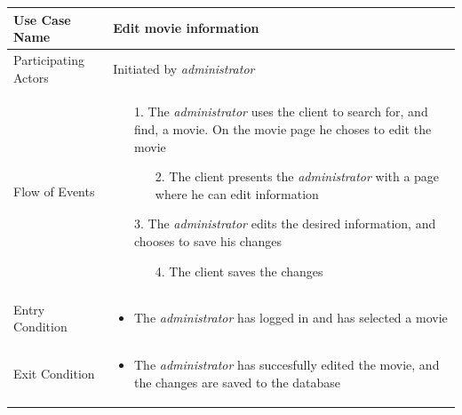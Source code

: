 \begin{center}
	\begin{tabular}{ | l | p{10cm} |  }
		 \hline
		Use Case Name & Edit movie information \\ \hline
		Participating Actors & Initiated by \emph{administrator} \\ \hline
		Flow of Events & \begin{enumerate}
						\item[1.] The \emph{administrator} uses the client to search for, and find, a movie. On the movie page he choses to edit the movie
						\begin{enumerate}
							\item[2.] The client presents the \emph{administrator} with a page where he can edit information
						\end{enumerate}
						\item[3.] The \emph{administrator} edits the desired information, and chooses to save his changes
						\begin{enumerate}
							\item[4.] The client saves the changes
						\end{enumerate}
					\end{enumerate} \\ \hline
		Entry Condition & \begin{itemize}
						\item The \emph{administrator} has logged in and has selected a movie
					\end{itemize} \\ \hline
		Exit Condition & \begin{itemize}
						\item The \emph{administrator} has succesfully edited the movie, and the changes are saved to the database
					\end{itemize} \\
		\hline
	\end{tabular}
\end{center}




